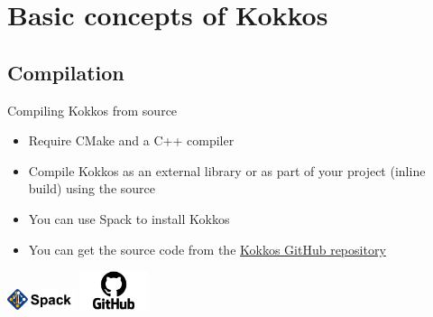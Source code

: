 \documentclass[aspectratio=169]{beamer}
\begin{document}

\section{Basic concepts of Kokkos}


\subsection{Compilation}


\begin{frame}{Compiling Kokkos from source}
    \begin{itemize}
        \item Require CMake and a C++ compiler
        \item Compile Kokkos as an external library or as part of your project (inline build) using the source
        \item You can use Spack to install Kokkos
        \item You can get the source code from the \href{https://github.com/kokkos/kokkos}{Kokkos GitHub repository}
    \end{itemize}
    \begin{center}
        \includegraphics[width=0.15\textwidth]{spack.png}
        \includegraphics[width=0.15\textwidth]{GitHub-logo.png}
    \end{center}
\end{frame}

\end{document}

